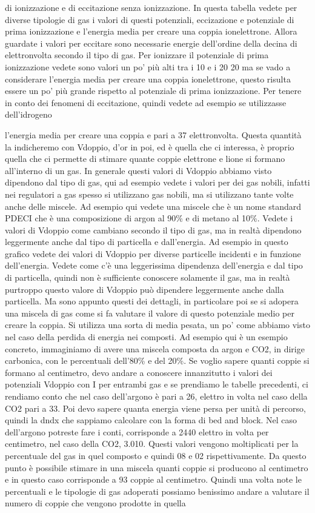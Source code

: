 di ionizzazione e di eccitazione senza ionizzazione. In questa tabella vedete per diverse tipologie di gas i valori di questi potenziali, eccizazione e potenziale di prima ionizzazione e l'energia media per creare una coppia ionelettrone. Allora guardate i valori per eccitare sono necessarie energie dell'ordine della decina di elettronvolta secondo il tipo di gas. Per ionizzare il potenziale di prima ionizzazione vedete sono valori un po' più alti tra i 10 e i 20 20 ma se vado a considerare l'energia media per creare una coppia ionelettrone, questo risulta essere un po' più grande rispetto al potenziale di prima ionizzazione. Per tenere in conto dei fenomeni di eccitazione, quindi vedete ad esempio se utilizzasse dell'idrogeno 

l'energia media per creare una coppia e pari a 37 elettronvolta. Questa quantità la indicheremo con Vdoppio, d'or in poi, ed è quella che ci interessa, è proprio quella che ci permette di stimare quante coppie elettrone e lione si formano all'interno di un gas. In generale questi valori di Vdoppio abbiamo visto dipendono dal tipo di gas, qui ad esempio vedete i valori per dei gas nobili, infatti nei regulatori a gas spesso si utilizzano gas nobili, ma si utilizzano tante volte anche delle miscele. Ad esempio qui vedete una miscele che è un nome standard PDECI che è una composizione di argon al 90\% e di metano al 10\%. Vedete i valori di Vdoppio come cambiano secondo il tipo di gas, ma in realtà dipendono leggermente anche dal tipo di particella e dall'energia. Ad esempio in questo grafico vedete dei valori di Vdoppio per diverse particelle incidenti e in funzione dell'energia. Vedete come c'è una leggerissima dipendenza dell'energia e dal tipo di particella, quindi non è sufficiente conoscere solamente il gas, ma in realtà purtroppo questo valore di Vdoppio può dipendere leggermente anche dalla particella. Ma sono appunto questi dei dettagli, in particolare poi se si adopera una miscela di gas come si fa valutare il valore di questo potenziale medio per creare la coppia. Si utilizza una sorta di media pesata, un po' come abbiamo visto nel caso della perdida di energia nei composti. Ad esempio qui è un esempio concreto, immaginiamo di avere una miscela composta da argon e CO2, in dirige carbonica, con le percentuali dell'80\% e del 20\%. Se voglio sapere quanti coppie si formano al centimetro, devo andare a conoscere innanzitutto i valori dei potenziali Vdoppio con I per entrambi gas e se prendiamo le tabelle precedenti, ci rendiamo conto che nel caso dell'argono è pari a 26, elettro in volta nel caso della CO2 pari a 33. Poi devo sapere quanta energia viene persa per unità di percorso, quindi la dndx che sappiamo calcolare con la forma di bed and block. Nel caso dell'argono potreste fare i conti, corrisponde a 2440 elettro in volta per centimetro, nel caso della CO2, 3.010. Questi valori vengono moltiplicati per la percentuale del gas in quel composto e quindi 08 e 02 rispettivamente. Da questo punto è possibile stimare in una miscela quanti coppie si producono al centimetro e in questo caso corrisponde a 93 coppie al centimetro. Quindi una volta note le percentuali e le tipologie di gas adoperati possiamo benissimo andare a valutare il numero di coppie che vengono prodotte in quella 